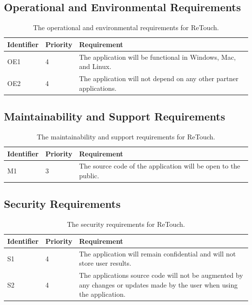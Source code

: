 \documentclass[12pt, titlepage]{article}
\begin{document}
\subsection{Operational and Environmental Requirements}

\begin{table}[H]
  \caption{The operational and environmental requirements for ReTouch.}
\begin{tabular}{ |m{2cm}|m{1.8cm}|m{9.4cm}| }
    \hline
    \textbf{Identifier} & \textbf{Priority} & \textbf{Requirement} \\ 
    \hline
    OE1 & 4 & The application will be functional in Windows, Mac, and Linux. \\
    \hline
    OE2 & 4 & The application will not depend on any other partner applications. \\
    \hline
\end{tabular}
\end{table}

\subsection{Maintainability and Support Requirements}

\begin{table}[H]
  \caption{The maintainability and support requirements for ReTouch.}
\begin{tabular}{ |m{2cm}|m{1.8cm}|m{9.4cm}| }
    \hline
    \textbf{Identifier} & \textbf{Priority} & \textbf{Requirement} \\ 
    \hline
    M1 & 3 & The source code of the application will be open to the public. \\
    \hline
\end{tabular}
\end{table}

\subsection{Security Requirements}

\begin{table}[H]
  \caption{The security requirements for ReTouch.}
\begin{tabular}{ |m{2cm}|m{1.8cm}|m{9.4cm}| }
    \hline
    \textbf{Identifier} & \textbf{Priority} & \textbf{Requirement} \\ 
    \hline
    S1 & 4 & The application will remain confidential and will not store user results.\\
    \hline
    S2 & 4 & The applications source code will not be augmented by any changes or updates made by the user when using the application. \\
    \hline
\end{tabular}
\end{table}
\end{document}
